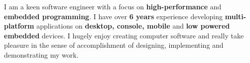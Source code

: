 
\begin{cvparagraph}

I am a keen software engineer with a focus on \textbf{high-performance} and \textbf{embedded programming}. I have over \textbf{6 years} experience
developing \textbf{multi-platform} applications on \textbf{desktop, console, mobile} and \textbf{low powered embedded} devices.
I hugely enjoy creating computer software and really take pleasure in the sense of accomplishment of designing,
implementing and demonstrating my work.

\end{cvparagraph}
